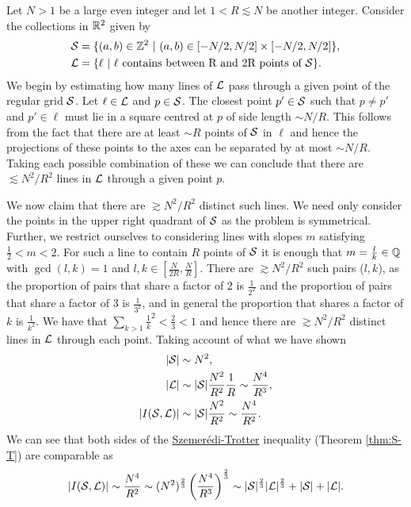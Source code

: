 \begin{example}
    Let $N>1$ be a large even integer and let $1<R \lesssim N$ be another integer. Consider the collections in $\mathbb R^2$ given by
    \begin{align*}
        \mathcal S &= \{ (a,b) \in \mathbb Z^2 \ | \ (a,b) \in [-N/2,N/2] \times [-N/2,N/2] \}, \\
        \mathcal L &= \{ \ell \ | \ \ell \text{ contains between R and 2R points of } \mathcal S \}. \end{align*}
    We begin by estimating how many lines of $\mathcal L$ pass through a given point of the regular grid $\mathcal S$.
    Let $\ell \in \mathcal L$ and $p \in \mathcal S$. The closest point $p' \in \mathcal S$ such that $p \neq p'$ and $p' \in \ell$ must lie
    in a square centred at $p$ of side length $\sim N/R$. This follows from the fact that there are at least $\sim R$ points of $\mathcal S$ in $\ell$ and hence the
    projections of these points to the axes can be separated by at most $\sim N/R$. Taking each possible combination of these we can conclude that there are $\lesssim N^2 / R^2$ lines in $\mathcal L$ through a
    given point $p$.

    We now claim that there are $\gtrsim N^2 / R^2$ distinct such lines. We need only consider the points in the upper right quadrant of $\mathcal S$ as the problem is symmetrical.
    Further, we restrict ourselves to considering lines with slopes $m$ satisfying $\frac{1}{2} < m < 2$. For such a line to contain $R$  points
    of $\mathcal S$ it is enough that $m= \frac{l}{k} \in \mathbb Q$ with $\gcd(l,k) =1$ and $l,k \in \left[\frac{N}{2R}, \frac{N}{R} \right]$. There are $\gtrsim N^2/R^2$ such pairs ($l,k$), as the proportion of pairs that share a factor of 2 is $\frac{1}{2^2}$ and the proportion of pairs that share a factor 
    of 3 is $\frac{1}{3^2}$, and in general the proportion that shares a factor of $k$ is $\frac{1}{k^2}$. We have that $\sum_{k>1} \frac{1}{k}^2 < \frac{2}{3} < 1$ and hence there are $\gtrsim N^2 /R^2$ distinct
    lines in $\mathcal L$ through each point. Taking account of what we have shown
    \begin{align*}
        |\mathcal S| &\sim N^2, \\ 
        |\mathcal L| &\sim |\mathcal S| \frac{N^2}{R^2} \frac{1}{R} \sim \frac{N^4}{R^3},\\
        |I(\mathcal S, \mathcal L)| &\sim |\mathcal S| \frac{N^2}{R^2} \sim \frac{N^4}{R^2}.\\
    \end{align*}
    We can see that both sides of the \hyperref[thm:S-T]{Szemerédi-Trotter} inequality (Theorem \ref{thm:S-T}) are comparable as
    \[
    |I(\mathcal S, \mathcal L)| \sim \frac{N^4}{R^2} \sim (N^2)^{\frac{2}{3}} \left(\frac{N^4}{R^3}\right)^{\frac{2}{3}} \sim |\mathcal S|^{\frac{2}{3}}|\mathcal L|^{\frac{2}{3}} + |\mathcal S| + |\mathcal L|.
    \]
\end{example}


